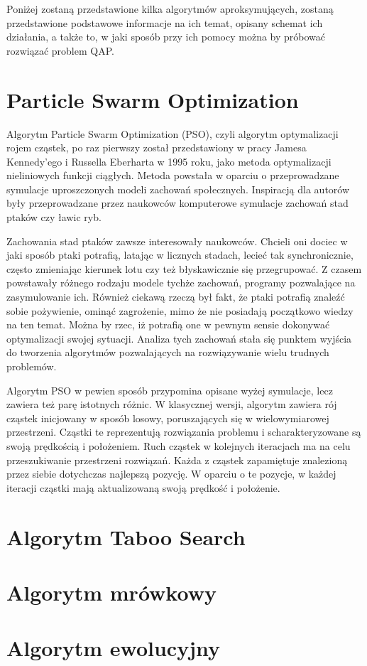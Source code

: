 Poniżej zostaną przedstawione kilka algorytmów aproksymujących, zostaną przedstawione podstawowe informacje na ich temat, opisany schemat ich działania, a także to, w jaki sposób przy ich pomocy można by próbować rozwiązać problem QAP.
\section{Particle Swarm Optimization}
\label{sec:PSO}

Algorytm Particle Swarm Optimization (PSO), czyli algorytm optymalizacji rojem cząstek, po raz pierwszy został przedstawiony w pracy Jamesa Kennedy'ego i Russella Eberharta w 1995 roku, jako metoda optymalizacji nieliniowych funkcji ciągłych. Metoda powstała w oparciu o przeprowadzane symulacje uproszczonych modeli zachowań społecznych. Inspiracją dla autorów były przeprowadzane przez naukowców komputerowe  symulacje zachowań stad ptaków czy ławic ryb.

Zachowania stad ptaków zawsze interesowały naukowców. Chcieli oni dociec w jaki sposób ptaki potrafią, latając w licznych stadach, lecieć tak synchronicznie, często zmieniając kierunek lotu czy też błyskawicznie się przegrupować. Z czasem powstawały różnego rodzaju modele tychże zachowań, programy pozwalające na zasymulowanie ich. Również ciekawą rzeczą był fakt, że ptaki potrafią znaleźć sobie pożywienie, ominąć zagrożenie, mimo że nie posiadają początkowo wiedzy na ten temat. Można by rzec, iż potrafią one w pewnym sensie dokonywać optymalizacji swojej sytuacji. Analiza tych zachowań stała się punktem wyjścia do tworzenia algorytmów pozwalających na rozwiązywanie wielu trudnych problemów.

Algorytm PSO w pewien sposób przypomina opisane wyżej symulacje, lecz zawiera też parę istotnych różnic. W klasycznej wersji, algorytm zawiera rój cząstek inicjowany w sposób losowy, poruszających się w wielowymiarowej przestrzeni. Cząstki te reprezentują rozwiązania problemu i scharakteryzowane są swoją prędkością i położeniem. Ruch cząstek w kolejnych iteracjach ma na celu przeszukiwanie przestrzeni rozwiązań. Każda z cząstek zapamiętuje znalezioną przez siebie dotychczas najlepszą pozycję. W oparciu o te pozycje, w każdej iteracji cząstki mają aktualizowaną swoją prędkość i położenie.
\section{Algorytm Taboo Search}
\label{sec:TS}

\section{Algorytm mrówkowy}
\label{sec:mrowka}

\section{Algorytm ewolucyjny}
\label{sec:AE}